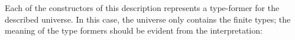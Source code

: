 \begin{code}[hide]%
\>[0]\AgdaSpace{}%
\AgdaSpace{}%
\<%
\end{code}
\begin{code}%
\>[0][@{}l@{\AgdaIndent{1}}]%
\>[2]\AgdaSpace{}%
\AgdaSpace{}%
\AgdaSymbol{:}\AgdaSpace{}%
\AgdaSpace{}%
\<%
\\
\>[2][@{}l@{\AgdaIndent{0}}]%
\>[4]\AgdaSpace{}%
%
\>[13]\AgdaSymbol{:}\AgdaSpace{}%
\<%
\\
%
\>[4]\AgdaSpace{}%
%
\>[13]\AgdaSymbol{:}\AgdaSpace{}%
\AgdaSpace{}%
\AgdaSpace{}%
\AgdaSpace{}%
\AgdaSpace{}%
\<%
\end{code}
Each of the constructors of this description represents a type-former for the described universe. In this case, the universe only contains the finite types; the meaning of the type formers should be evident from the interpretation:
\begin{code}%
%
\>[2]\AgdaSpace{}%
\AgdaSymbol{:}\AgdaSpace{}%
\AgdaSpace{}%
\AgdaSpace{}%
\<%
\\
%
\>[2]\AgdaSpace{}%
%
\>[13]\AgdaSymbol{=}\AgdaSpace{}%
\<%
\\
%
\>[2]\AgdaSpace{}%
%
\>[13]\AgdaSymbol{=}\AgdaSpace{}%
\<%
\\
%
\>[2]\AgdaSpace{}%
\AgdaSymbol{(}\AgdaSpace{}%
\AgdaSpace{}%
\AgdaSymbol{)}%
\>[13]\AgdaSymbol{=}\AgdaSpace{}%
\AgdaSpace{}%
\AgdaSpace{}%
\AgdaSpace{}%
\AgdaSpace{}%
\<%
\\
%
\>[2]\AgdaSpace{}%
\AgdaSymbol{(}\AgdaSpace{}%
\AgdaSpace{}%
\AgdaSymbol{)}%
\>[13]\AgdaSymbol{=}\AgdaSpace{}%
\AgdaSpace{}%
\AgdaSpace{}%
\AgdaSpace{}%
\AgdaSpace{}%
\<%
\end{code}

